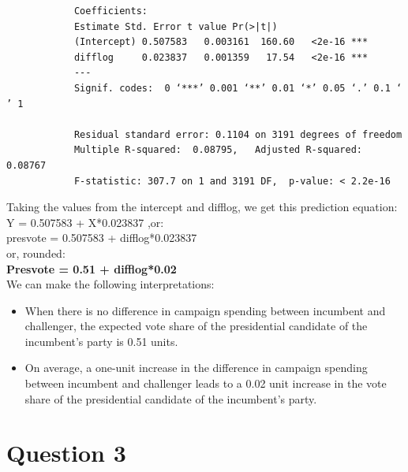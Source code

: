\documentclass[12pt,letterpaper]{article}
\begin{document}
\begin{enumerate}
\begin{verbatim}
			Coefficients:
			Estimate Std. Error t value Pr(>|t|)    
			(Intercept) 0.507583   0.003161  160.60   <2e-16 ***
			difflog     0.023837   0.001359   17.54   <2e-16 ***
			---
			Signif. codes:  0 ‘***’ 0.001 ‘**’ 0.01 ‘*’ 0.05 ‘.’ 0.1 ‘ ’ 1
			
			Residual standard error: 0.1104 on 3191 degrees of freedom
			Multiple R-squared:  0.08795,	Adjusted R-squared:  0.08767 
			F-statistic: 307.7 on 1 and 3191 DF,  p-value: < 2.2e-16
		\end{verbatim}
		Taking the values from the intercept and difflog, we get this prediction equation: \\
		Y = 0.507583 + X*0.023837          ,or:\\
		presvote = 0.507583 + difflog*0.023837   \\
		or, rounded: \\
		\textbf{Presvote = 0.51 + difflog*0.02}	\\
		
		We can make the following interpretations:
		\begin{itemize}
			\item When there is no difference in campaign spending between incumbent and challenger, the expected vote share of the presidential candidate of the incumbent's party is 0.51 units. \\
			\item On average, a one-unit increase in the difference in campaign spending between incumbent and challenger leads to a 0.02 unit increase in the vote share of the presidential candidate of the incumbent's party.
		
		\end{itemize}
	\end{enumerate}
	
	\newpage
\section*{Question 3}
\end{document}
